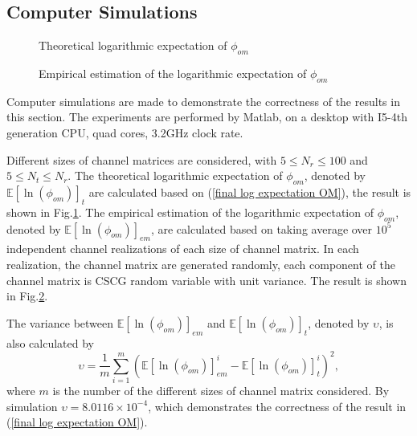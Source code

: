 \documentclass[12pt, draftclsnofoot, onecolumn]{IEEEtran}
\begin{document}
\subsection{Computer Simulations}
\begin{figure}[htb]
\centering
\def\svgwidth{\columnwidth}

\caption{Theoretical logarithmic expectation of $\phi_{om}$}
\label{flogOMt}
\end{figure}
\begin{figure}[htb]
\centering
\def\svgwidth{\columnwidth}

\caption{Empirical estimation of the logarithmic expectation of $\phi_{om}$}
\label{flogOMem}
\end{figure}
Computer simulations are made to demonstrate the correctness of the results in this section. The experiments are performed by Matlab, on a desktop with I5-4th generation CPU, quad cores, 3.2GHz clock rate.

Different sizes of channel matrices are considered, with $5\leq N_{r}\leq 100$ and $5\leq N_{t}\leq N_{r}$. The theoretical logarithmic expectation of $\phi_{om}$, denoted by $\mathbb{E}[\ln(\phi_{om})]_{t}$ are calculated based on (\ref{final log expectation OM}), the result is shown in Fig.\ref{flogOMt}. The empirical estimation of the logarithmic expectation of $\phi_{om}$, denoted by $\mathbb{E}[\ln(\phi_{om})]_{em}$, are calculated based on taking average over $10^{5}$ independent channel realizations of each size of channel matrix. In each realization, the channel matrix are generated randomly, each component of the channel matrix is CSCG random variable with unit variance. The result is shown in Fig.\ref{flogOMem}. 

The variance between $\mathbb{E}[\ln(\phi_{om})]_{em}$ and $\mathbb{E}[\ln(\phi_{om})]_{t}$, denoted by $\upsilon$, is also calculated by \begin{equation}
\upsilon=\frac{1}{m}\sum_{i=1}^{m}(\mathbb{E}[\ln(\phi_{om})]^{i}_{em}-\mathbb{E}[\ln(\phi_{om})]^{i}_{t})^{2},
\label{variance OM}
\end{equation} 
where $m$ is the number of the different sizes of channel matrix considered. By simulation $\upsilon=8.0116\times 10^{-4}$, which demonstrates the correctness of the result in (\ref{final log expectation OM}).

\end{document}
